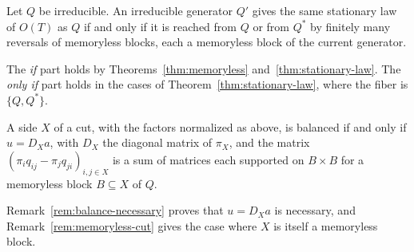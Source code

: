 \begin{conjecture}\label{conj:fiber}
Let $Q$ be irreducible. An irreducible generator $Q'$ gives the same stationary law of $O(T)$ as
$Q$ if and only if it is reached from $Q$ or from $Q^*$ by finitely many reversals of memoryless
blocks, each a memoryless block of the current generator.
\end{conjecture}

The \emph{if} part holds by Theorems~\ref{thm:memoryless} and~\ref{thm:stationary-law}. The
\emph{only if} part holds in the cases of Theorem~\ref{thm:stationary-law}, where the fiber is
$\{Q,Q^*\}$.

\begin{conjecture}\label{conj:balanced}
A side $X$ of a cut, with the factors normalized as above, is balanced if and only if $u=D_Xa$, with
$D_X$ the diagonal matrix of $\pi_X$, and the matrix $(\pi_iq_{ij}-\pi_jq_{ji})_{i,j\in X}$ is a sum
of matrices each supported on $B\times B$ for a memoryless block $B\subseteq X$ of $Q$.
\end{conjecture}

Remark~\ref{rem:balance-necessary} proves that $u=D_Xa$ is necessary, and
Remark~\ref{rem:memoryless-cut} gives the case where $X$ is itself a memoryless block.
